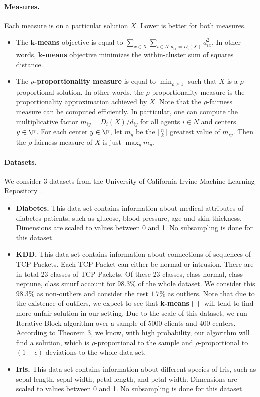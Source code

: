 \paragraph{Measures.} Each measure is on a particular solution $X$. Lower is better for both measures.
\begin{itemize}
	\item The $\mathbf{k}$\textbf{-means} objective is equal to $\sum_{x \in X} \sum_{i \in N: d_{ix} = D_i(X)} d_{ix}^2$. In other words, $\mathbf{k}$\textbf{-means} objective minimizes the within-cluster sum of squares distance. 
	\item The $\rho$\textbf{-proportionality measure} is equal to $\min_{\rho \geq 1}$ such that $X$ is a $\rho$-proportional solution. In other words, the $\rho$-proportionality measure is the proportionality approximation achieved by $X$. Note that the $\rho$-fairness measure can be computed efficiently. In particular, one can compute the multiplicative factor $m_{iy} = D_i(X)/d_{iy}$ for all agents $i \in N$ and centers $y \in \F$. For each center $y \in \F$, let $m_y$ be the $\lceil \frac{n}{k} \rceil$ greatest value of $m_{iy}$. Then the $\rho$-fairness measure of $X$ is just $\max_y m_y$. 
\end{itemize}

\paragraph{Datasets.} We consider 3 datasets from the University of California Irvine Machine Learning Repository~\cite{UCI}.
\begin{itemize}
	\item \textbf{Diabetes.} This data set contains information about medical attributes of diabetes patients, such as glucose, blood pressure, age and skin thickness. Dimensions are scaled to values between 0 and 1. No subsampling is done for this dataset.
	\item \textbf{KDD.} This data set contains information about connections of sequences of TCP Packets. Each TCP Packet can either be normal or intrusion. There are in total 23 classes of TCP Packets. Of these 23 classes, class normal, class neptune, class smurf account for 98.3$\%$ of the whole dataset. We consider this $98.3\%$ as non-outliers and consider the rest $1.7\%$ as outliers. Note that due to the existence of outliers, we expect to see that \textbf{k-means++} will tend to find more unfair solution in our setting. Due to the scale of this dataset, we run Iterative Block algorithm over a sample of 5000 clients and 400 centers. According to Theorem 3, we know, with high probability, our algorithm will find a solution, which is $\rho$-proportional to the sample and $\rho$-proportional to $(1+\epsilon)$-deviations to the whole data set. 
	\item \textbf{Iris.} This data set contains information about different species of Iris, such as sepal length, sepal width, petal length, and petal width. Dimensions are scaled to values between 0 and 1. No subsampling is done for this dataset.
\end{itemize}


